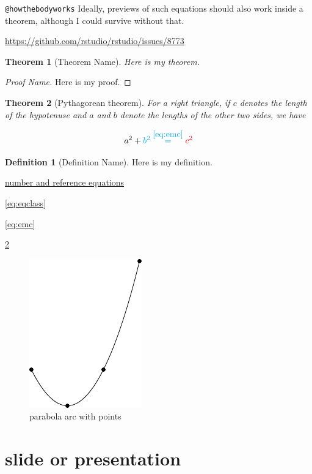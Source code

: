 \documentclass[
]{book}
\newtheorem{theorem}{Theorem}[chapter]
\theoremstyle{definition}
\newtheorem{definition}{Definition}[chapter]
\theoremstyle{definition}
\theoremstyle{definition}
\theoremstyle{definition}
\theoremstyle{remark}
\begin{document}
\texttt{@howthebodyworks} Ideally, previews of such equations should also work inside a theorem, although I could survive without that.

\url{https://github.com/rstudio/rstudio/issues/8773}

\begin{theorem}[Theorem Name]
\protect\hypertarget{thm:label}{}\label{thm:label}Here is my theorem.
\end{theorem}

\begin{proof}[Proof Name]
Here is my proof.
\end{proof}

\begin{theorem}[Pythagorean theorem]
\protect\hypertarget{thm:pyth}{}\label{thm:pyth}For a right triangle, if \(c\) denotes the length of the hypotenuse
and \(a\) and \(b\) denote the lengths of the other two sides, we have

\[a^2 + \color{cyan}b^2 \overset{\ref{eq:emc}}= \color{red}{c^2} \]
\end{theorem}

\begin{definition}[Definition Name]
\protect\hypertarget{def:unnamed-chunk-54}{}\label{def:unnamed-chunk-54}Here is my definition.
\end{definition}

\protect\hyperlink{nice-label}{number and reference equations}

\eqref{eq:eqclass}

\eqref{eq:emc}

\ref{thm:pyth}

\begin{figure}
\includegraphics[width=0.25\linewidth]{202401280001-test_files/figure-latex/parabola-arc-with-points-1} \caption{parabola arc with points}\label{fig:parabola-arc-with-points}
\end{figure}

\hypertarget{slide-or-presentation}{%
\section{slide or presentation}\label{slide-or-presentation}}
\end{document}

